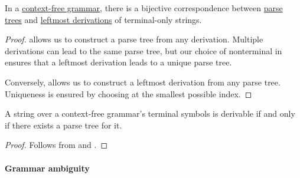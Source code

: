\begin{proposition}\label{thm:derivations_and_parse_trees}
  In a \hyperref[def:chomsky_hierarchy/context_free]{context-free grammar}, there is a bijective correspondence between \hyperref[def:parse_tree]{parse trees} and \hyperref[def:leftmost_derivation]{leftmost derivations} of terminal-only strings.
\end{proposition}
\begin{proof}
   allows us to construct a parse tree from any derivation. Multiple derivations can lead to the same parse tree, but our choice of nonterminal in  ensures that a leftmost derivation leads to a unique parse tree.

  Conversely,  allows us to construct a leftmost derivation from any parse tree. Uniqueness is ensured by choosing at  the smallest possible index.
\end{proof}

\begin{corollary}\label{thm:parse_tree_existence}
  A string over a context-free grammar's terminal symbols is derivable if and only if there exists a parse tree for it.
\end{corollary}
\begin{proof}
  Follows from  and .
\end{proof}

\paragraph{Grammar ambiguity}

